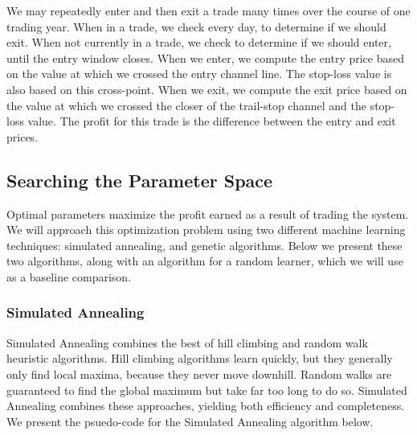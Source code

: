 \documentclass[12pt]{article}
\begin{document}
\pagebreak
We may repeatedly enter and then exit a trade many times over the course of one
trading year. When in a trade, we check every day, to determine if we should
exit.  When not currently in a trade, we check to determine if we should enter,
until the entry window closes. When we enter, we compute the entry price based
on the value at which we crossed the entry channel line. The stop-loss value is
also based on this cross-point. When we exit, we compute the exit price based on
the value at which we crossed the closer of the trail-stop channel and the
stop-loss value. The profit for this trade is the difference between the entry
and exit prices.

\subsection{Searching the Parameter Space}

Optimal parameters maximize the profit earned as a result of trading the
system.  We will approach this optimization problem using two different machine
learning techniques: simulated annealing, and genetic algorithms.  Below we
present these two algorithms, along with an algorithm for a random learner,
which we will use as a baseline comparison.

\subsubsection{Simulated Annealing}

Simulated Annealing combines the best of hill climbing and random walk
heuristic algorithms.  Hill climbing algorithms learn quickly, but they
generally only find local maxima, because they never move downhill. Random
walks are guaranteed to find the global maximum but take far too long to do so.
Simulated Annealing combines these approaches, yielding both efficiency and
completeness.  We present the psuedo-code for the Simulated Annealing algorithm
below.
\end{document}

